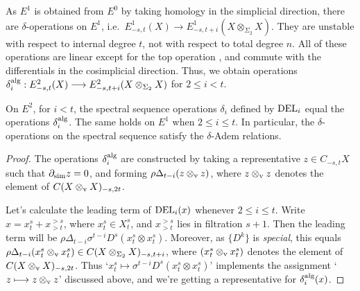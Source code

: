 \documentclass[10pt]{article}
\newcommand{\twist}{\sigma}
\begin{document}
\begin{AdamsSSEQ operations final}
As $E^1$ is obtained from $E^0$ by taking homology in the simplicial direction, there are $\delta$-operations on $E^1$, i.e.\ $E^1_{-s,t}(X)\to E^1_{-s,t+i}(X\otimes_{\Sigma_2}X)$. They are unstable with respect to internal degree $t$, not with respect to total degree $n$. All of these operations are linear except for the top operation \cite[4.2]{DwyerHtpyOpsSimpComAlg.pdf}, and commute with the differentials in the cosimplicial direction. Thus, we obtain operations $\delta_i^\textup{alg}:E^2_{-s,t}(X)\to E^2_{-s,t+i}(X\otimes_{\Sigma_2}X)$ for $2\leq i<t$.
\begin{prop}
On $E^2$, for $i<t$, the spectral sequence operations $\delta_i$ defined by $\textup{DEL}_i$ equal the operations $\delta_i^\textup{alg}$. The same holds on $E^1$ when $2\leq i\leq t$. In particular, the $\delta$-operations on the spectral sequence satisfy the $\delta$-Adem relations.
\end{prop}
\begin{proof}
The operations $\delta_i^\textup{alg}$ are constructed by taking a representative $z\in C_{-s,t}X$ such that $\partial_\textup{sim}z=0$, and forming $\rho\Delta_{t-i}(z\otimes_\textup{v} z)$, where $z\otimes_\textup{v} z$ denotes the element of $C(X\otimes_\textup{v}X)_{-s,2t}$.

Let's calculate the leading term of $\textup{DEL}_{i}(x)$ whenever $2\leq i\leq t$. Write $x=x^s_t+x^{>s}_{>t}$, where $x^s_t\in X^s_t$, and $x^{>s}_{>t}$ lies in filtration $s+1$. Then the leading term will be $\rho\Delta_{t-i}\twist^{t-i}D^s (x^s_t\otimes x^s_t)$. Moreover, as $\{D^k\}$ is \emph{special}, this equals $\rho{\Delta}_{t-i}(x^s_t\otimes_\textup{v} x^s_t)\in C(X\otimes_{\Sigma_2} X)_{-s,t+i}$, where $(x^s_t\otimes_\textup{v} x^s_t)$ denotes the element of $C(X\otimes_\textup{v}X)_{-s,2t}$. Thus `$x^s_t\mapsto \twist^{t-i}D^s(x^s_t\otimes x^s_t)$' implements the assignment `$z\mapsto z\otimes_\textup{v} z$' discussed above, and we're getting a representative for $\delta_i^\textup{alg}(x)$.
\end{proof}

\end{AdamsSSEQ operations final}
\end{document}
